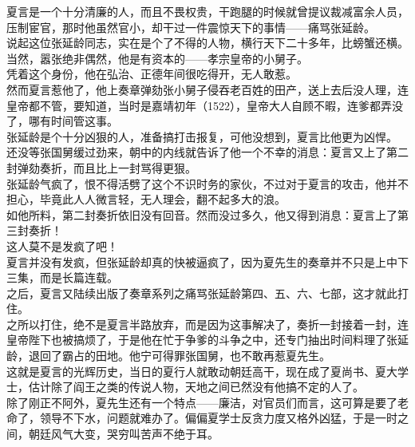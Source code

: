 \begin{multicols}{\theparacolNo}
夏言是一个十分清廉的人，而且不畏权贵，干跑腿的时候就曾提议裁减富余人员，压制宦官，那时他虽然官小，却干过一件震惊天下的事情——痛骂张延龄。\\

说起这位张延龄同志，实在是个了不得的人物，横行天下二十多年，比螃蟹还横。当然，嚣张绝非偶然，他是有资本的——孝宗皇帝的小舅子。\\

凭着这个身份，他在弘治、正德年间很吃得开，无人敢惹。\\

然而夏言惹他了，他上奏章弹劾张小舅子侵吞老百姓的田产，送上去后没人理，连皇帝都不管，要知道，当时是嘉靖初年（1522），皇帝大人自顾不暇，连爹都弄没了，哪有时间管这事。\\

张延龄是个十分凶狠的人，准备搞打击报复，可他没想到，夏言比他更为凶悍。\\

还没等张国舅缓过劲来，朝中的内线就告诉了他一个不幸的消息：夏言又上了第二封弹劾奏折，而且比上一封骂得更狠。\\

张延龄气疯了，恨不得活劈了这个不识时务的家伙，不过对于夏言的攻击，他并不担心，毕竟此人人微言轻，无人理会，翻不起多大的浪。\\

如他所料，第二封奏折依旧没有回音。然而没过多久，他又得到消息：夏言上了第三封奏折！\\

这人莫不是发疯了吧！\\

夏言并没有发疯，但张延龄却真的快被逼疯了，因为夏先生的奏章并不只是上中下三集，而是长篇连载。\\

之后，夏言又陆续出版了奏章系列之痛骂张延龄第四、五、六、七部，这才就此打住。\\

之所以打住，绝不是夏言半路放弃，而是因为这事解决了，奏折一封接着一封，连皇帝陛下也被搞烦了，于是他在忙于争爹的斗争之中，还专门抽出时间料理了张延龄，退回了霸占的田地。他宁可得罪张国舅，也不敢再惹夏先生。\\

这就是夏言的光辉历史，当日的夏行人就敢动朝廷高干，现在成了夏尚书、夏大学士，估计除了阎王之类的传说人物，天地之间已然没有他搞不定的人了。\\

除了刚正不阿外，夏先生还有一个特点——廉洁，对官员们而言，这可算是要了老命了，领导不下水，问题就难办了。偏偏夏学士反贪力度又格外凶猛，于是一时之间，朝廷风气大变，哭穷叫苦声不绝于耳。\\


\end{multicols}

